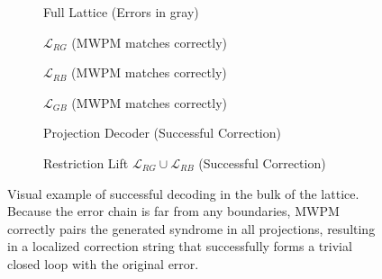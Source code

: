 \documentclass{article}
\begin{document}
\begin{figure}[ht]
    \centering
    \begin{subfigure}{0.45\textwidth}
        \centering
        \resizebox{\textwidth}{!}{}
        \caption{Full Lattice (Errors in gray)}
    \end{subfigure}
    \hfill
    \begin{subfigure}{0.45\textwidth}
        \centering
        \resizebox{\textwidth}{!}{}
        \caption{$\mathcal{L}_{RG}$ (MWPM matches correctly)}
    \end{subfigure}
    
    \vspace{1cm}
    
    \begin{subfigure}{0.45\textwidth}
        \centering
        \resizebox{\textwidth}{!}{}
        \caption{$\mathcal{L}_{RB}$ (MWPM matches correctly)}
    \end{subfigure}
    \hfill
    \begin{subfigure}{0.45\textwidth}
        \centering
        \resizebox{\textwidth}{!}{}
        \caption{$\mathcal{L}_{GB}$ (MWPM matches correctly)}
    \end{subfigure}
    \vspace{1cm}
    
    \begin{subfigure}{0.45\textwidth}
        \centering
        \resizebox{\textwidth}{!}{}
        \caption{Projection Decoder (Successful Correction)}
    \end{subfigure}
    \hfill
    \begin{subfigure}{0.45\textwidth}
        \centering
        \resizebox{\textwidth}{!}{}
        \caption{Restriction Lift $\mathcal{L}_{RG} \cup \mathcal{L}_{RB}$ (Successful Correction)}
    \end{subfigure}
    \caption{Visual example of successful decoding in the bulk of the lattice. Because the error chain is far from any boundaries, MWPM correctly pairs the generated syndrome in all projections, resulting in a localized correction string that successfully forms a trivial closed loop with the original error.}
\end{figure}
\end{document}
